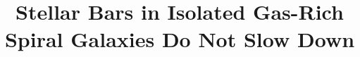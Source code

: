 \documentclass[twocolumn,linenumbers]{aastex631}
\begin{document}
\title{Stellar Bars in Isolated Gas-Rich Spiral Galaxies Do Not Slow Down}


\end{document}
